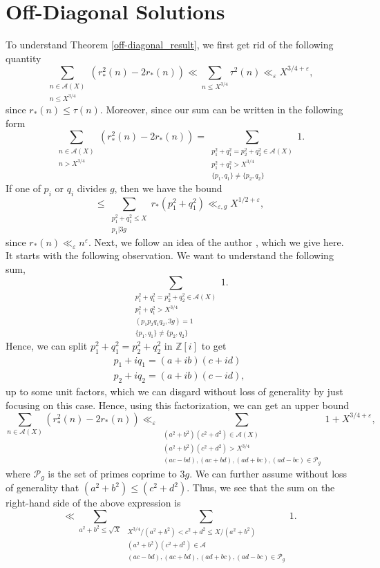 \documentclass[12pt]{amsart}
\theoremstyle{definition}
\theoremstyle{definition}
\theoremstyle{remark}
\numberwithin{equation}{section}
\newcommand{\Z}{\mathbb{Z}}
\newcommand{\CA}{\mathcal{A}}
\newcommand{\CP}{\mathcal{P}}
\renewcommand{\leq}{\leqslant}
\begin{document}
\section{Off-Diagonal Solutions}\label{off_diagonal_section}
To understand Theorem \ref{off-diagonal_result}, we first get rid of the following quantity
$$ \sum_{\substack{n\in \CA(X) \\ n\leq X^{3/4}}} (r_*^2(n) - 2r_*(n)) \ll \sum_{n\leq X^{3/4}} \tau^2(n) \ll_{\varepsilon} X^{3/4+\varepsilon}, $$
since $r_*(n)\leq \tau(n)$. Moreover, since our sum can be written in the following form
$$ \sum_{\substack{n\in \CA(X) \\ n>X^{3/4}}} (r_*^2(n)-2r_*(n)) = \sum_{\substack{p_1^2+q_1^2 = p_2^2+q_2^2 \in \CA(X) \\ p_1^2+q_1^2 > X^{3/4} \\ \{p_1,q_1\}\not=\{p_2,q_2\}}} 1. $$
If one of $p_i$ or $q_i$ divides $g$, then we have the bound
$$ \leq \sum_{\substack{p_1^2+q_1^2 \leq X \\ p_1|3g }} r_*(p_1^2+q_1^2) \ll_{\varepsilon, g} X^{1/2+\varepsilon}  ,$$
since $r_*(n) \ll_{\varepsilon} n^{\varepsilon}$. Next, we follow an idea of the author \cite{MR4756119}, which we give here. It starts with the following observation. We want to understand the following sum,
$$\sum_{\substack{p_1^2+q_1^2 = p_2^2+q_2^2 \in \CA(X) \\ p_1^2+q_1^2 > X^{3/4} \\ (p_1p_2q_1q_2,3g)=1 \\ \{p_1,q_1\}\not=\{p_2,q_2\}}} 1. $$
Hence, we can split $p_1^2+q_1^2 = p_2^2+q_2^2$ in $\Z[i]$ to get
\begin{align*}
p_1+iq_1 = (a+ib)(c+id) \\
p_2+iq_2 = (a+ib)(c-id),
\end{align*}
up to some unit factors, which we can disgard without loss of generality by just focusing on this case.
Hence, using this factorization, we can get an upper bound
$$ \sum_{n\in \CA(X)} (r_*^2(n)-2r_*(n)) \ll_{\varepsilon}  \sum_{\substack{(a^2+b^2)(c^2+d^2) \in \CA(X) \\ (a^2+b^2)(c^2+d^2)> X^{3/4} \\ (ac-bd), (ac+bd), (ad+bc), (ad-bc) \in \CP_g}} 1  + X^{3/4+\varepsilon}, $$
where $\CP_g$ is the set of primes coprime to $3g$.
We can further assume without loss of generality that $(a^2+b^2)\leq (c^2+d^2)$. Thus, we see that the sum on the
right-hand side of the above expression is
$$ \ll \sum_{a^2+b^2 \leq \sqrt{X}} \sum_{\substack{X^{3/4}/(a^2+b^2) < c^2+d^2 \leq X/(a^2+b^2) \\ (a^2+b^2)(c^2+d^2) \in \CA \\ (ac-bd), (ac+bd), (ad+bc), (ad-bc) \in \CP_g}} 1 .$$
\end{document}
